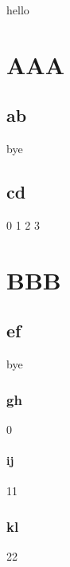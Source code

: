\documentclass{article}%
\begin{document}
%
\normalsize%
hello%
\chapter{AAA}%
\label{chap:AAA}%
\section{ab}%
\label{sec:ab}%
bye

%
\section{cd}%
\label{sec:cd}%
0%
1%
2%
3

%
\chapter{BBB}%
\label{chap:BBB}%
\section{ef}%
\label{sec:ef}%
bye%
\subsection{gh}%
\label{subsec:gh}%
0%
\subsubsection{ij}%
\label{ssubsec:ij}%
11

%
\subsection{kl}%
\label{subsec:kl}%
22

%
\end{document}
